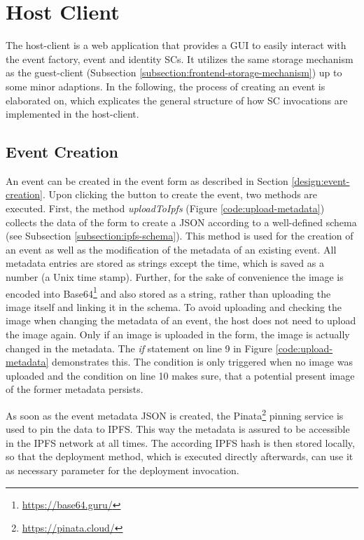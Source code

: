 \section{Host Client}
The host-client is a web application that provides a GUI to easily interact with the event factory, event and identity SCs. It utilizes the same storage mechanism as the guest-client (Subsection \ref{subsection:frontend-storage-mechanism}) up to some minor adaptions. In the following, the process of creating an event is elaborated on, which explicates the general structure of how SC invocations are implemented in the host-client.

\subsection{Event Creation}
An event can be created in the event form as described in Section \ref{design:event-creation}. Upon clicking the button to create the event, two methods are executed. First, the method \textit{uploadToIpfs} (Figure \ref{code:upload-metadata}) collects the data of the form to create a JSON according to a well-defined schema (see Subsection \ref{subsection:ipfs-schema}). This method is used for the creation of an event as well as the modification of the metadata of an existing event. All metadata entries are stored as strings except the time, which is saved as a number (a Unix time stamp). Further, for the sake of convenience the image is encoded into Base64\footnote{\href{https://base64.guru/}{https://base64.guru/}} and also stored as a string, rather than uploading the image itself and linking it in the schema. To avoid uploading and checking the image when changing the metadata of an event, the host does not need to upload the image again. Only if an image is uploaded in the form, the image is actually changed in the metadata. The \textit{if} statement on line 9 in Figure \ref{code:upload-metadata} demonstrates this. The condition is only triggered when no image was uploaded and the condition on line 10 makes sure, that a potential present image of the former metadata persists.

As soon as the event metadata JSON is created, the Pinata\footnote{\href{https://pinata.cloud/}{https://pinata.cloud/}} pinning service is used to pin the data to IPFS. This way the metadata is assured to be accessible in the IPFS network at all times. The according IPFS hash is then stored locally, so that the deployment method, which is executed directly afterwards, can use it as necessary parameter for the deployment invocation.


